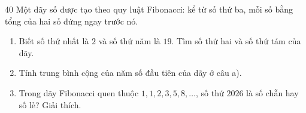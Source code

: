 \begin{probbox}{40}{}
Một dãy số được tạo theo quy luật Fibonacci: kể từ số thứ ba, mỗi số bằng tổng của hai số đứng ngay trước nó.
\begin{enumerate}[label=\alph*),leftmargin=1.6em,itemsep=0pt,topsep=2pt]
  \item Biết số thứ nhất là $2$ và số thứ năm là $19$. Tìm số thứ hai và số thứ tám của dãy.
  \item Tính trung bình cộng của năm số đầu tiên của dãy ở câu a).
  \item Trong dãy Fibonacci quen thuộc $1, 1, 2, 3, 5, 8, \ldots$, số thứ $2026$ là số chẵn hay số lẻ? Giải thích.
\end{enumerate}
\end{probbox}

